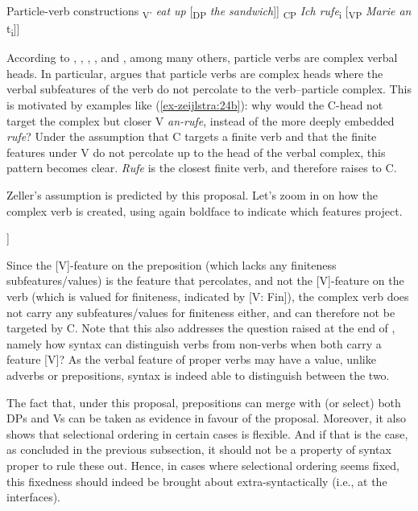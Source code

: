 \documentclass[output=paper
,modfonts
,nonflat]{langsci/langscibook}
\begin{document}
\begin{exe}
	\ex Particle-verb constructions \label{ex-zeijlstra:24}
	\xlist
	\ex {[}\textsubscript{V'} \textit{eat up} {[}\textsubscript{DP} \textit{the sandwich}{]}{]}
	\ex {[}\textsubscript{CP} \textit{Ich rufe}\textsubscript{i} \label{ex-zeijlstra:24b} {[}\textsubscript{VP} \textit{Marie an} t\textsubscript{i}{]}{]}
	\endxlist
\end{exe}
According to \citet{Riemsdijk1978}, \citet{Baker1988}, \citet{Koopman1995}, \citet{Neeleman1994, Neeleman2002}, and \citet{Zeller2001}, among many others, particle verbs are complex verbal heads. In particular, \citet{Zeller2001} argues that particle verbs are complex heads where the verbal subfeatures of the verb do not percolate to the verb–particle complex. This is motivated by examples like (\ref{ex-zeijlstra:24b}): why would the C-head not target the complex but closer V \textit{an-rufe}, instead of the more deeply embedded \textit{rufe}? Under the assumption that C targets a finite verb and that the finite features under V do not percolate up to the head of the verbal complex, this pattern becomes clear. \textit{Rufe} is the closest finite verb, and therefore raises to C.

Zeller’s assumption is predicted by this proposal. Let’s zoom in on how the complex verb is created, using again boldface to indicate which features project.

	\begin{exe}
    \ex
			\begin{forest}	
				[V{=}\{\textbf{{[}V{]}}{,} \textbf{{[}uD{]}}\}
				[P{=}\{\textbf{{[}V{]}}{,} {[}uV{]}{,} \textbf{{[}uD{]}}\}]
				[V{=}\{{[}V: Fin{]}\}] ]
		\end{forest}
	\end{exe}
\noindent Since the [V]-feature on the preposition (which lacks any finiteness subfeatures\slash values) is the feature that percolates, and not the [V]-feature on the verb (which is valued for finiteness, indicated by [V: Fin]), the complex verb does not carry any subfeatures\slash values for finiteness either, and can therefore not be targeted by C. Note that this also addresses the question raised at the end of , namely how syntax can distinguish verbs from non-verbs when both carry a feature [V]? As the verbal feature of proper verbs may have a value, unlike adverbs or prepositions, syntax is indeed able to distinguish between the two.

The fact that, under this proposal, prepositions can merge with (or select) both DPs and Vs can be taken as evidence in favour of the proposal. Moreover, it also shows that selectional ordering in certain cases is flexible. And if that is the case, as concluded in the previous subsection, it should not be a property of syntax proper to rule these out. Hence, in cases where selectional ordering seems fixed, this fixedness should indeed be brought about extra-syntactically (i.e., at the interfaces).
\end{document}

